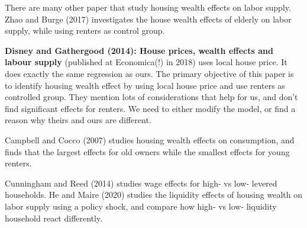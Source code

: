\documentclass[12pt,letterpaper]{article}
\begin{document}
There are many other paper that study housing wealth effects on labor supply. Zhao and Burge (2017) investigates the house wealth effects of elderly on labor supply, while using renters as control group. 

\textbf{Disney and Gathergood (2014): House prices, wealth effects and labour supply} (published at Economica(!) in 2018) uses local house price. It does exactly the same regression as ours. The primary objective of this paper is to identify housing wealth effect by using local house price and use renters as controlled group. They mention lots of considerations that help for us, and don't find significant effects for renters. We need to either modify the model, or find a reason why theirs and ours are different. 

Campbell and Cocco (2007) studies housing wealth effects on consumption, and finds that the largest effects for old owners while the smallest effects for young renters. 

  Cunningham and Reed (2014) studies wage effects for high- vs low- levered households. He and Maire (2020) studies the liquidity effects of housing wealth on labor supply using a policy shock, and compare how high- vs low- liquidity household react differently.  
\bigskip
\end{document}
